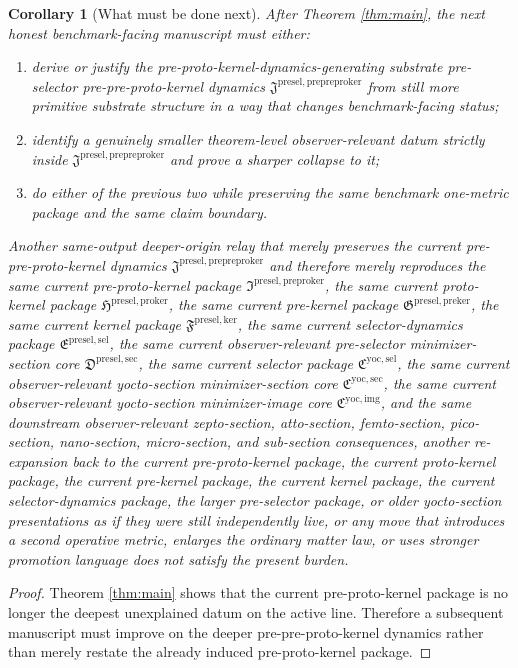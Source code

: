 \documentclass[11pt]{article}
\newcommand{\YoctoImageCore}{\mathfrak C^{\mathrm{yoc,img}}}
\newcommand{\YoctoMinSectionCore}{\mathfrak C^{\mathrm{yoc,sec}}}
\newcommand{\YoctoSelectorPackage}{\mathfrak C^{\mathrm{yoc,sel}}}
\newcommand{\PreSelectorMinSectionCore}{\mathfrak D^{\mathrm{presel,sec}}}
\newcommand{\PreSectionSelectorPackage}{\mathfrak E^{\mathrm{presel,sel}}}
\newcommand{\KernelPackage}{\mathfrak F^{\mathrm{presel,ker}}}
\newcommand{\PreKernelPackage}{\mathfrak G^{\mathrm{presel,preker}}}
\newcommand{\ProtoKernelPackage}{\mathfrak H^{\mathrm{presel,proker}}}
\newcommand{\PreProtoKernelPackage}{\mathfrak I^{\mathrm{presel,preproker}}}
\newcommand{\PrePreProtoKernelPackage}{\mathfrak J^{\mathrm{presel,prepreproker}}}
\newtheorem{corollary}{Corollary}
\begin{document}
\begin{corollary}[What must be done next]
\label{cor:next}
After Theorem \ref{thm:main}, the next honest benchmark-facing manuscript must either:
\begin{enumerate}
    \item derive or justify the pre-proto-kernel-dynamics-generating substrate pre-selector pre-pre-proto-kernel dynamics \(\PrePreProtoKernelPackage\) from still more primitive substrate structure in a way that changes benchmark-facing status;
    \item identify a genuinely smaller theorem-level observer-relevant datum strictly inside \(\PrePreProtoKernelPackage\) and prove a sharper collapse to it;
    \item do either of the previous two while preserving the same benchmark one-metric package and the same claim boundary.
\end{enumerate}
Another same-output deeper-origin relay that merely preserves the current pre-pre-proto-kernel dynamics \(\PrePreProtoKernelPackage\) and therefore merely reproduces the same current pre-proto-kernel package \(\PreProtoKernelPackage\), the same current proto-kernel package \(\ProtoKernelPackage\), the same current pre-kernel package \(\PreKernelPackage\), the same current kernel package \(\KernelPackage\), the same current selector-dynamics package \(\PreSectionSelectorPackage\), the same current observer-relevant pre-selector minimizer-section core \(\PreSelectorMinSectionCore\), the same current selector package \(\YoctoSelectorPackage\), the same current observer-relevant yocto-section minimizer-section core \(\YoctoMinSectionCore\), the same current observer-relevant yocto-section minimizer-image core \(\YoctoImageCore\), and the same downstream observer-relevant zepto-section, atto-section, femto-section, pico-section, nano-section, micro-section, and sub-section consequences, another re-expansion back to the current pre-proto-kernel package, the current proto-kernel package, the current pre-kernel package, the current kernel package, the current selector-dynamics package, the larger pre-selector package, or older yocto-section presentations as if they were still independently live, or any move that introduces a second operative metric, enlarges the ordinary matter law, or uses stronger promotion language does not satisfy the present burden.
\end{corollary}

\begin{proof}
Theorem \ref{thm:main} shows that the current pre-proto-kernel package is no longer the deepest unexplained datum on the active line. Therefore a subsequent manuscript must improve on the deeper pre-pre-proto-kernel dynamics rather than merely restate the already induced pre-proto-kernel package.
\end{proof}
\end{document}

